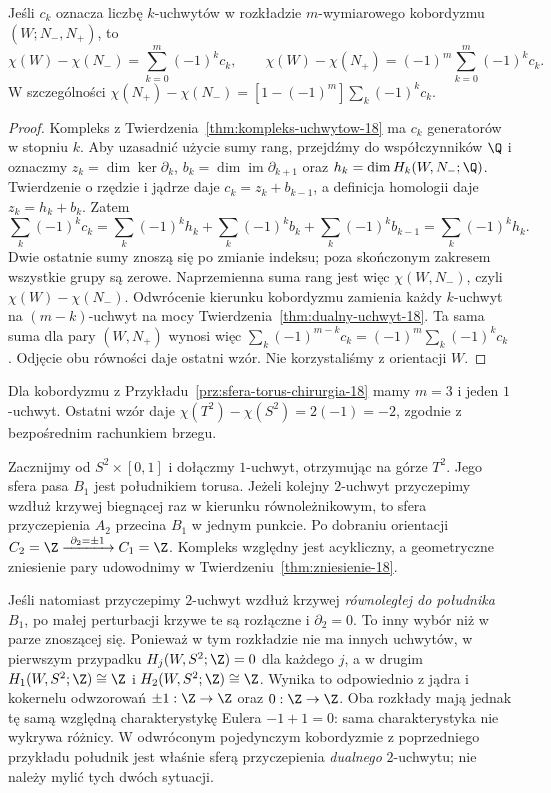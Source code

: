 \begin{stwierdzenie}
\label{prop:euler-uchwyty-23}
Jeśli $c_k$ oznacza liczbę $k$-uchwytów w rozkładzie
$m$-wymiarowego kobordyzmu $(W;N_-,N_+)$, to
\[
 \chi(W)-\chi(N_-)=\sum_{k=0}^{m}(-1)^k c_k,
 \qquad
 \chi(W)-\chi(N_+)=(-1)^m\sum_{k=0}^{m}(-1)^k c_k.
\]
W szczególności
$\chi(N_+)-\chi(N_-)
 =[1-(-1)^m]\sum_k(-1)^k c_k$.
\end{stwierdzenie}
\begin{proof}
Kompleks z Twierdzenia~\ref{thm:kompleks-uchwytow-18}
ma $c_k$ generatorów w stopniu $k$. Aby uzasadnić użycie
sumy rang, przejdźmy do współczynników $\Q$ i oznaczmy
$z_k=\dim\ker\partial_k$, $b_k=\dim\operatorname{im}\partial_{k+1}$
oraz $h_k=\dim H_k(W,N_-;\Q)$. Twierdzenie o rzędzie i jądrze
daje $c_k=z_k+b_{k-1}$, a definicja homologii daje
$z_k=h_k+b_k$. Zatem
\[
 \sum_k(-1)^k c_k
 =\sum_k(-1)^k h_k
   +\sum_k(-1)^k b_k+\sum_k(-1)^k b_{k-1}
 =\sum_k(-1)^k h_k.
\]
Dwie ostatnie sumy znoszą się po zmianie indeksu;
poza skończonym zakresem wszystkie grupy są zerowe.
Naprzemienna suma rang jest więc $\chi(W,N_-)$,
czyli $\chi(W)-\chi(N_-)$. Odwrócenie kierunku
kobordyzmu zamienia każdy $k$-uchwyt na
$(m-k)$-uchwyt na mocy
Twierdzenia~\ref{thm:dualny-uchwyt-18}.
Ta sama suma dla pary $(W,N_+)$ wynosi więc
$\sum_k(-1)^{m-k}c_k=(-1)^m\sum_k(-1)^k c_k$.
Odjęcie obu równości daje ostatni wzór.
Nie korzystaliśmy z orientacji $W$.
\end{proof}

Dla kobordyzmu z Przykładu~\ref{prz:sfera-torus-chirurgia-18}
mamy $m=3$ i jeden $1$-uchwyt. Ostatni wzór daje
$\chi(T^2)-\chi(S^2)=2(-1)=-2$, zgodnie z
bezpośrednim rachunkiem brzegu.

\begin{przyklad}
\label{prz:meridian-longitude-18}
Zacznijmy od $S^2\times[0,1]$ i
dołączmy $1$-uchwyt, otrzymując na górze $T^2$.
Jego sfera pasa $B_1$ jest południkiem
torusa. Jeżeli kolejny $2$-uchwyt przyczepimy
wzdłuż krzywej biegnącej raz w kierunku
równoleżnikowym, to sfera przyczepienia
$A_2$ przecina $B_1$ w jednym punkcie.
Po dobraniu orientacji
$C_2=\Z\xrightarrow{\ \partial_2=\pm1\ }
 C_1=\Z$.
Kompleks względny jest acykliczny,
a geometryczne zniesienie pary
udowodnimy w
Twierdzeniu~\ref{thm:zniesienie-18}.

Jeśli natomiast przyczepimy $2$-uchwyt
wzdłuż krzywej \emph{równoległej do
południka} $B_1$, po małej perturbacji
krzywe te są rozłączne i $\partial_2=0$.
To inny wybór niż w parze znoszącej się.
Ponieważ w tym rozkładzie nie ma innych uchwytów,
w pierwszym przypadku $H_j(W,S^2;\Z)=0$ dla każdego $j$,
a w drugim $H_1(W,S^2;\Z)\cong\Z$ i
$H_2(W,S^2;\Z)\cong\Z$. Wynika to odpowiednio z jądra
i kokernelu odwzorowań $\pm1:\Z\to\Z$ oraz $0:\Z\to\Z$.
Oba rozkłady mają jednak tę samą względną charakterystykę
Eulera $-1+1=0$: sama charakterystyka nie wykrywa różnicy.
W odwróconym pojedynczym kobordyzmie
z poprzedniego przykładu południk
jest właśnie sferą przyczepienia
\emph{dualnego} $2$-uchwytu;
nie należy mylić tych dwóch sytuacji.
\end{przyklad}

